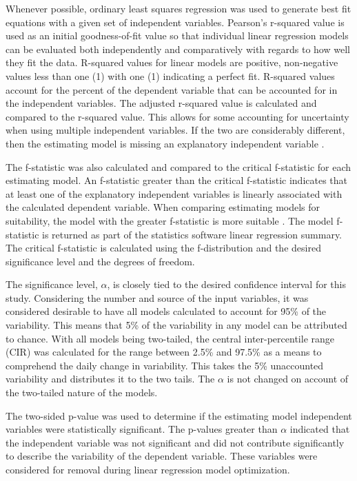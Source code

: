 \begin{linenumbers}
Whenever possible, ordinary least squares regression was used to generate best fit equations with a given set of independent variables.  Pearson's r-squared value is used as an initial goodness-of-fit value so that individual linear regression models can be evaluated both independently and comparatively with regards to how well they fit the data.  R-squared values for linear models are positive, non-negative values less than one (1) with one (1) indicating a perfect fit.  R-squared values account for the percent of the dependent variable that can be accounted for in the independent variables.  The adjusted r-squared value is calculated and compared to the r-squared value.  This allows for some accounting for uncertainty when using multiple independent variables. If the two are considerably different, then the estimating model is missing an explanatory independent variable \parencite{Johnson2007}.

The f-statistic was also calculated and compared to the critical f-statistic for each estimating model. An f-statistic greater than the critical f-statistic indicates that at least one of the explanatory independent variables is linearly associated with the calculated dependent variable.  When comparing estimating models for suitability, the model with the greater f-statistic is more suitable \parencite{Johnson2007}.  The model f-statistic is returned as part of the statistics software linear regression summary.  The critical f-statistic is calculated using the f-distribution and the desired significance level and the degrees of freedom.

The significance level, $\alpha$, is closely tied to the desired confidence interval for this study.  Considering the number and source of the input variables, it was considered desirable to have all models calculated to account for 95\% of the variability.  This means that 5\% of the variability in any model can be attributed to chance.  With all models being two-tailed, the central inter-percentile range (CIR) was calculated for the range between 2.5\% and 97.5\% as a means to comprehend the daily change in variability.  This takes the 5\% unaccounted variability and distributes it to the two tails.  The $\alpha$ is not changed on account of the two-tailed nature of the models.

The two-sided p-value was used to determine if the estimating model independent variables were statistically significant.  The p-values greater than $\alpha$ indicated that the independent variable was not significant and did not contribute significantly to describe the variability of the dependent variable.  These variables were considered for removal during linear regression model optimization.


\end{linenumbers}
